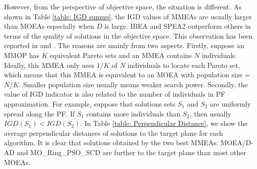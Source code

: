 \documentclass[conference]{IEEEtran}
\begin{document}
 However, from the perspective of objective space, the situation is different. As shown in Table \ref{table: IGD sumup}, the IGD values of MMEAs are usually larger than MOEAs especially when $D$ is large. IBEA and SPEA2 outperform others in terms of the quality of solutions in the objective space. This observation has been reported in \cite{MO-Ring-PSO-SCD} and \cite{Shir:2009dz}. The reasons are mainly from two aspects. Firstly, suppose an MMOP has $K$ equivalent Pareto sets and an MMEA contains $N$ individuals. Ideally, this MMEA only uses $1/K$ of $N$ individuals to locate each Pareto set,  which means that this MMEA is equivalent to an MOEA with population size = $N/K$. Smaller population size usually means weaker search power. Secondly, the value of IGD indicator is also related to the number of individuals in PF approximation. For example, suppose that solutions sets $S_1$ and $S_2$ are uniformly spread along the PF. If $S_1$ contains more individuals than $S_2$, then usually $IGD(S_1) < IGD(S_2)$. In Table \ref{table: Perpendicular Distance}, we show the average perpendicular distances of solutions to the target plane for each algorithm. It is clear that solutions obtained by the two best MMEAs: MOEA/D-AD and MO\_Ring\_PSO\_SCD are further to the target plane than most other MOEAs.
\end{document}
